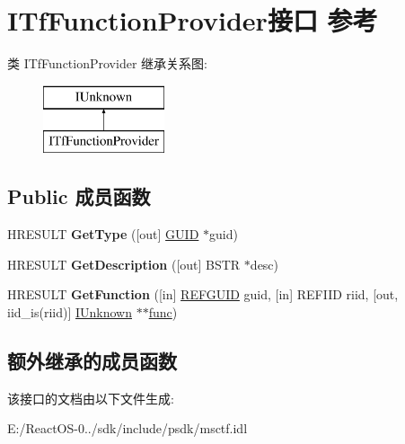 \hypertarget{interface_i_tf_function_provider}{}\section{I\+Tf\+Function\+Provider接口 参考}
\label{interface_i_tf_function_provider}
类 I\+Tf\+Function\+Provider 继承关系图\+:\begin{figure}[H]
\begin{center}
\leavevmode
\includegraphics[height=2.000000cm]{interface_i_tf_function_provider}
\end{center}
\end{figure}
\subsection*{Public 成员函数}
\begin{DoxyCompactItemize}
\item 
\mbox{\label{interface_i_tf_function_provider_a18f5b6086ff96d697c82d9ee4f2f5b16}} 
H\+R\+E\+S\+U\+LT {\bfseries Get\+Type} (\mbox{[}out\mbox{]} \hyperlink{interface_g_u_i_d}{G\+U\+ID} $\ast$guid)
\item 
\mbox{\label{interface_i_tf_function_provider_afbe42bddc422d48b89ce757d3e11e020}} 
H\+R\+E\+S\+U\+LT {\bfseries Get\+Description} (\mbox{[}out\mbox{]} B\+S\+TR $\ast$desc)
\item 
\mbox{\label{interface_i_tf_function_provider_a0f91974331b9aaff5f0ddc05ecd24dac}} 
H\+R\+E\+S\+U\+LT {\bfseries Get\+Function} (\mbox{[}in\mbox{]} \hyperlink{struct___g_u_i_d}{R\+E\+F\+G\+U\+ID} guid, \mbox{[}in\mbox{]} R\+E\+F\+I\+ID riid, \mbox{[}out, iid\+\_\+is(riid)\mbox{]} \hyperlink{interface_i_unknown}{I\+Unknown} $\ast$$\ast$\hyperlink{interfacevoid}{func})
\end{DoxyCompactItemize}
\subsection*{额外继承的成员函数}


该接口的文档由以下文件生成\+:\begin{DoxyCompactItemize}
\item 
E\+:/\+React\+O\+S-\/0../sdk/include/psdk/msctf.\+idl\end{DoxyCompactItemize}

